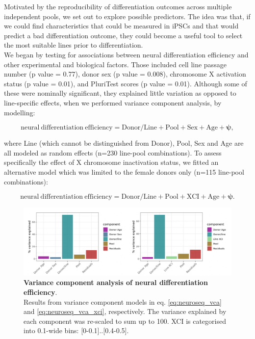 Motivated by the reproducibility of differentiation outcomes across multiple independent pools, we set out to explore possible predictors.
The idea was that, if we could find characteristics that could be measured in iPSCs and that would predict 
a bad differentiation outcome, they could become a 
useful tool to select the most suitable lines prior to differentiation. \\

We began by testing for associations between neural differentiation efficiency and other experimental and biological factors.
Those included cell line passage number (p value = 0.77), donor sex (p value = 0.008), chromosome X activation status (p value = 0.01), and PluriTest scores \cite{muller2011bioinformatic} (p value = 0.01).
Although some of these were nominally significant, they explained little variation as opposed to line-specific effects, when we performed variance component analysis, by modelling:

\begin{equation}\label{eq:neuroseq_vca}
    \mathrm{neural \ differentiation \ efficiency = Donor/Line + Pool + Sex + Age + \boldsymbol{\psi}},
\end{equation}

where Line (which cannot be distinguished from Donor), Pool, Sex and Age are all modeled as random effects (n=230 line-pool combinations).
To assess specifically the effect of X chromosome inactivation status, we fitted an alternative model which was limited to the female donors only (n=115 line-pool combinations):

\begin{equation}\label{eq:neuroseq_vca_xci}
    \mathrm{neural \ differentiation \ efficiency = Donor/Line + Pool + XCI + Age + \boldsymbol{\psi}}. 
\end{equation}

\begin{figure}[htbp]
\centering
\includegraphics[width=16cm]{Chapter5/Fig/neuroseq_diff_eff_vca.png}
\caption[Variance component analysis of neural differentiation efficiency]{\textbf{Variance component analysis of neural differentiation efficiency}.\\
Results from variance component models in eq. \eqref{eq:neuroseq_vca} and \eqref{eq:neuroseq_vca_xci}, respectively.
The variance explained by each component was re-scaled to sum up to 100.
XCI is categorised into 0.1-wide bins: [0-0.1]..[0.4-0.5].}
\label{fig:neuroseq_diff_eff_vca}
\end{figure}

